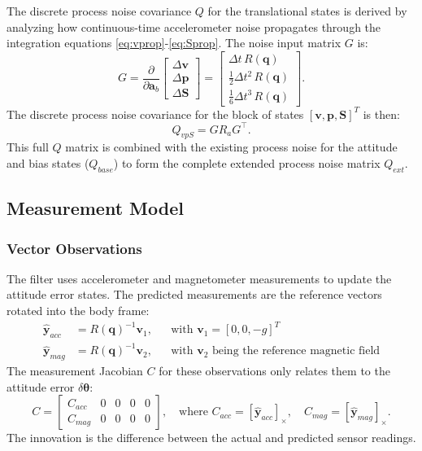 \documentclass[11pt,letterpaper]{article}
\begin{document}
The discrete process noise covariance $Q$ for the translational states is derived by analyzing how continuous-time accelerometer noise propagates through the integration equations \ref{eq:vprop}-\ref{eq:Sprop}. The noise input matrix $G$ is:
\begin{equation}
G = \frac{\partial}{\partial \bm{a}_b} \begin{bmatrix} \Delta \bm{v} \\ \Delta \bm{p} \\ \Delta \bm{S} \end{bmatrix} = \begin{bmatrix}
\Delta t \, R(\bm{q}) \\
\tfrac{1}{2}\Delta t^2 \, R(\bm{q}) \\
\tfrac{1}{6}\Delta t^3 \, R(\bm{q})
\end{bmatrix}.
\end{equation}
The discrete process noise covariance for the block of states $[\bm{v}, \bm{p}, \bm{S}]^T$ is then:
\begin{equation}
Q_{vpS} = G R_a G^\top.
\end{equation}
This full $Q$ matrix is combined with the existing process noise for the attitude and bias states ($Q_{base}$) to form the complete extended process noise matrix $Q_{ext}$.

\subsection{Measurement Model}
\label{ssec:measurement}

\subsubsection{Vector Observations}
The filter uses accelerometer and magnetometer measurements to update the attitude error states. The predicted measurements are the reference vectors rotated into the body frame:
\begin{align}
\hat{\bm{y}}_{acc} &= R(\bm{q})^{-1} \bm{v}_1, && \text{with } \bm{v}_1 = [0, 0, -g]^T \\
\hat{\bm{y}}_{mag} &= R(\bm{q})^{-1} \bm{v}_2, && \text{with } \bm{v}_2 \text{ being the reference magnetic field}
\end{align}
The measurement Jacobian $C$ for these observations only relates them to the attitude error $\delta \bm{\theta}$:
\begin{equation}
C = \begin{bmatrix}
C_{acc} & 0 & 0 & 0 & 0 \\
C_{mag} & 0 & 0 & 0 & 0
\end{bmatrix}, \quad \text{where } C_{acc} = [\hat{\bm{y}}_{acc}]_\times, \quad C_{mag} = [\hat{\bm{y}}_{mag}]_\times.
\end{equation}
The innovation is the difference between the actual and predicted sensor readings.
\end{document}
